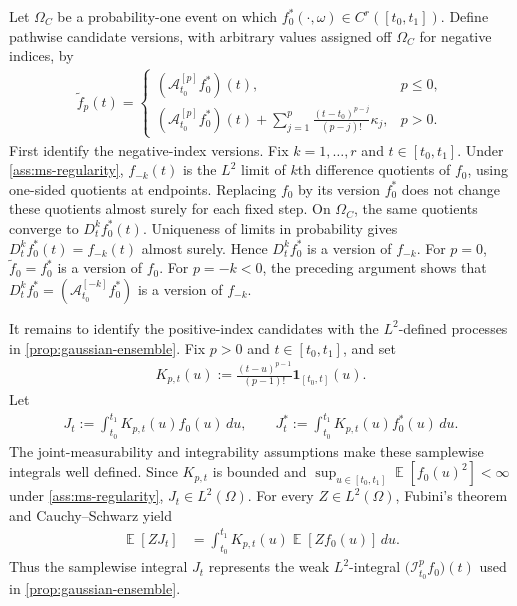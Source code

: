 \documentclass[11pt,a4paper]{article}
\theoremstyle{definition}
\theoremstyle{remark}
\DeclareMathOperator{\E}{\mathbb{E}}
\begin{document}
\begin{mainproof}
Let \(\Omega_C\) be a probability-one event on which \(f_0^\ast(\cdot,\omega)\in C^r([t_0,t_1])\). Define pathwise candidate versions, with arbitrary values assigned off \(\Omega_C\) for negative indices, by
\begin{align*}
\tilde f_p(t)=
\begin{cases}
(\mathcal A_{t_0}^{[p]}f_0^\ast)(t), & p\le 0,\\
(\mathcal A_{t_0}^{[p]}f_0^\ast)(t)+\displaystyle\sum_{j=1}^{p}\frac{(t-t_0)^{p-j}}{(p-j)!}\kappa_j, & p>0.
\end{cases}
\end{align*}
First identify the negative-index versions. Fix \(k=1,\ldots,r\) and \(t\in[t_0,t_1]\). Under \cref{ass:ms-regularity}, \(f_{-k}(t)\) is the \(L^2\) limit of \(k\)th difference quotients of \(f_0\), using one-sided quotients at endpoints. Replacing \(f_0\) by its version \(f_0^\ast\) does not change these quotients almost surely for each fixed step. On \(\Omega_C\), the same quotients converge to \(D_t^k f_0^\ast(t)\). Uniqueness of limits in probability gives \(D_t^k f_0^\ast(t)=f_{-k}(t)\) almost surely. Hence \(D_t^k f_0^\ast\) is a version of \(f_{-k}\). For \(p=0\), \(\tilde f_0=f_0^\ast\) is a version of \(f_0\). For \(p=-k<0\), the preceding argument shows that \(D_t^k f_0^\ast=(\mathcal A_{t_0}^{[-k]}f_0^\ast)\) is a version of \(f_{-k}\).

It remains to identify the positive-index candidates with the \(L^2\)-defined processes in \cref{prop:gaussian-ensemble}. Fix \(p>0\) and \(t\in[t_0,t_1]\), and set
\begin{align*}
K_{p,t}(u):=\frac{(t-u)^{p-1}}{(p-1)!}\mathbf 1_{[t_0,t]}(u).
\end{align*}
Let
\begin{align*}
J_t:=\int_{t_0}^{t_1}K_{p,t}(u)f_0(u)\,du,
\qquad
J_t^\ast:=\int_{t_0}^{t_1}K_{p,t}(u)f_0^\ast(u)\,du.
\end{align*}
The joint-measurability and integrability assumptions make these samplewise integrals well defined. Since \(K_{p,t}\) is bounded and \(\sup_{u\in[t_0,t_1]}\E[f_0(u)^2]<\infty\) under \cref{ass:ms-regularity}, \(J_t\in L^2(\Omega)\). For every \(Z\in L^2(\Omega)\), Fubini's theorem and Cauchy--Schwarz yield
\begin{align*}
\E[ZJ_t]
&=\int_{t_0}^{t_1}K_{p,t}(u)\E[Zf_0(u)]\,du.
\end{align*}
Thus the samplewise integral \(J_t\) represents the weak \(L^2\)-integral \(\bigl(\mathcal I_{t_0}^{p}f_0\bigr)(t)\) used in \cref{prop:gaussian-ensemble}.


\end{mainproof}
\end{document}

